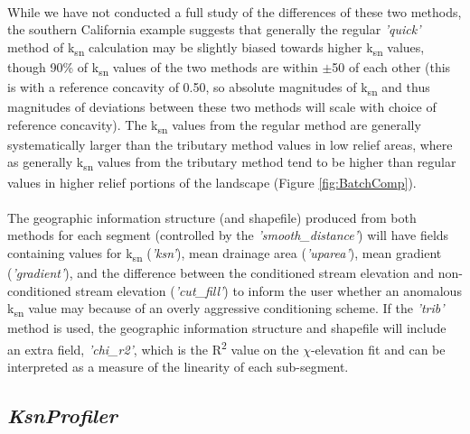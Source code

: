 \paragraph{}While we have not conducted a full study of the differences of these two methods, the southern California example suggests that generally the regular \textit{'quick'} method of k\textsubscript{sn} calculation may be slightly biased towards higher k\textsubscript{sn} values, though 90\% of k\textsubscript{sn} values of the two methods are within $\pm$50 of each other (this is with a reference concavity of 0.50, so absolute magnitudes of k\textsubscript{sn} and thus magnitudes of deviations between these two methods will scale with choice of reference concavity). The k\textsubscript{sn} values from the regular method are generally systematically larger than the tributary method values in low relief areas, where as generally k\textsubscript{sn} values from the tributary method tend to be higher than regular values in higher relief portions of the landscape (Figure \ref{fig:BatchComp}). 

\paragraph{}The geographic information structure (and shapefile) produced from both methods for each segment (controlled by the \textit{'smooth\_distance'}) will have fields containing values for k\textsubscript{sn} (\textit{'ksn'}), mean drainage area (\textit{'uparea'}), mean gradient (\textit{'gradient'}), and the difference between the conditioned stream elevation and non-conditioned stream elevation (\textit{'cut\_fill'}) to inform the user whether an anomalous k\textsubscript{sn} value may because of an overly aggressive conditioning scheme. If the \textit{'trib'} method is used, the geographic information structure and shapefile will include an extra field, \textit{'chi\_r2'}, which is the R\textsuperscript{2} value on the $\chi$-elevation fit and can be interpreted as a measure of the linearity of each sub-segment. 

\subsection{\textit{KsnProfiler}} \label{sec:KsnProfiler}

